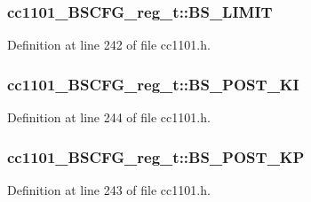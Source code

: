 \subsubsection[{\texorpdfstring{B\+S\+\_\+\+L\+I\+M\+IT}{BS_LIMIT}}]{ cc1101\+\_\+\+B\+S\+C\+F\+G\+\_\+reg\+\_\+t\+::\+B\+S\+\_\+\+L\+I\+M\+IT}\hypertarget{structcc1101___b_s_c_f_g__reg__t_a6dcdedcdc8332b3537d32002c93815c0}{}\label{structcc1101___b_s_c_f_g__reg__t_a6dcdedcdc8332b3537d32002c93815c0}


Definition at line 242 of file cc1101.\+h.

\subsubsection[{\texorpdfstring{B\+S\+\_\+\+P\+O\+S\+T\+\_\+\+KI}{BS_POST_KI}}]{ cc1101\+\_\+\+B\+S\+C\+F\+G\+\_\+reg\+\_\+t\+::\+B\+S\+\_\+\+P\+O\+S\+T\+\_\+\+KI}\hypertarget{structcc1101___b_s_c_f_g__reg__t_ae453cdd86877221f8bfc6facc280c937}{}\label{structcc1101___b_s_c_f_g__reg__t_ae453cdd86877221f8bfc6facc280c937}


Definition at line 244 of file cc1101.\+h.

\subsubsection[{\texorpdfstring{B\+S\+\_\+\+P\+O\+S\+T\+\_\+\+KP}{BS_POST_KP}}]{ cc1101\+\_\+\+B\+S\+C\+F\+G\+\_\+reg\+\_\+t\+::\+B\+S\+\_\+\+P\+O\+S\+T\+\_\+\+KP}\hypertarget{structcc1101___b_s_c_f_g__reg__t_a60f391317ffec99c4e12177e75af8d29}{}\label{structcc1101___b_s_c_f_g__reg__t_a60f391317ffec99c4e12177e75af8d29}


Definition at line 243 of file cc1101.\+h.

